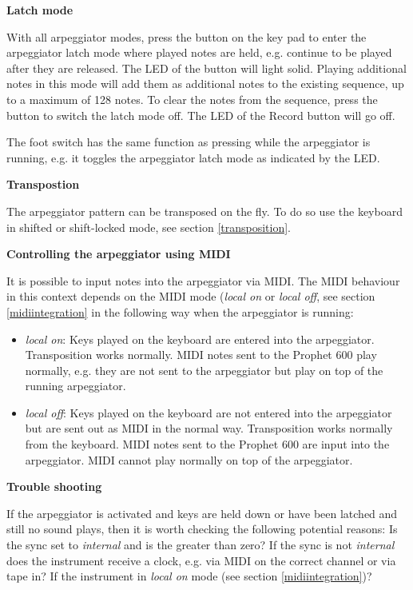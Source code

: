\textbf{Latch mode}

With all arpeggiator modes, press the \record button on the key pad to enter the arpeggiator latch mode where played notes are held, e.g. continue to be played after they are released. The LED of the \record button will light solid. Playing additional notes in this mode will add them as additional notes to the existing sequence, up to a maximum of 128 notes. To clear the notes from the sequence, press the \record button to switch the latch mode off. The LED of the Record button will go off.

The foot switch has the same function as pressing \record while the arpeggiator is running, e.g. it toggles the arpeggiator latch mode as indicated by the \record LED. 

\textbf{Transpostion}

The arpeggiator pattern can be transposed on the fly. To do so use the keyboard in shifted or shift-locked mode, see section \ref{transposition}.

\textbf{Controlling the arpeggiator using MIDI}

It is possible to input notes into the arpeggiator via MIDI. The MIDI behaviour in this context depends on the MIDI mode (\textit{local on} or \textit{local off}, see section \ref{midiintegration} in the following way when the arpeggiator is running:

\begin{itemize}
  \item \textit{local on}: Keys played on the keyboard are entered into the arpeggiator. Transposition works normally. MIDI notes sent to the Prophet 600 play normally, e.g. they are not sent to the arpeggiator but play  on top of the running arpeggiator.
  \item \textit{local off}: Keys played on the keyboard are not entered into the arpeggiator but are sent out as MIDI in the normal way. Transposition works normally from the keyboard. MIDI notes sent to the Prophet 600 are input into the arpeggiator. MIDI cannot play normally on top of the arpeggiator. 
\end{itemize}

\textbf{Trouble shooting}

If the arpeggiator is activated and keys are held down or have been latched and still no sound plays, then it is worth checking the following potential reasons: Is the sync set to \textit{internal} and is the \clock greater than zero? If the sync is not \textit{internal} does the instrument receive a clock, e.g. via MIDI on the correct channel or via tape in? If the instrument in \textit{local on} mode (see section \ref{midiintegration})?

